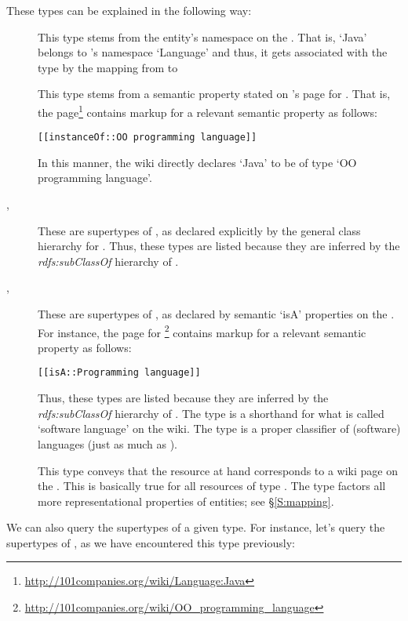 \documentclass{llncs}
\begin{document}
\noindent
These types can be explained in the following way:
%
\begin{description}
%
\item[] This type stems from the entity's namespace
  on the . That is, `Java' belongs to 's namespace
  `Language' and thus, it gets associated with the type 
  by the mapping from  to \solasote
%
\item[] This type stems from a
  semantic property stated on 's page for . That
  is, the
  page\footnote{\url{http://101companies.org/wiki/Language:Java}}
  contains markup for a relevant semantic property as follows:
\begin{center}
\begin{BVerbatim}
[[instanceOf::OO programming language]]
\end{BVerbatim}
\end{center}
\noindent
In this manner, the wiki directly declares `Java' to be of type `OO
programming language'.
%
\item[, ] These are supertypes
  of , as declared explicitly by the general class
  hierarchy for \solasote. Thus, these types are listed because they
  are inferred by the \emph{rdfs:subClassOf} hierarchy of \solasote.
%
\item[, ]
  These are supertypes of , as
  declared by semantic `isA' properties on the . For
  instance, the
  page for \footnote{\url{http://101companies.org/wiki/OO_programming_language}}
  contains markup for a relevant semantic property as follows:
\begin{center}
\begin{BVerbatim}
[[isA::Programming language]]
\end{BVerbatim}
\end{center}
\noindent
Thus, these types are listed because they are inferred by the
\emph{rdfs:subClassOf} hierarchy of \solasote. The type
 is a shorthand for what is called `software
language' on the wiki. The type  is a
proper classifier of (software) languages (just as much as
).
%
\item[] This type conveys that the resource at hand
  corresponds to a wiki page on the . This is basically
  true for all resources of type . The type factors
  all more representational properties of entities; see
  \S\ref{S:mapping}.
%
\end{description}
%
We can also query the supertypes of a given type. For instance, let's
query the supertypes of , as we
have encountered this type previously:
\end{document}
